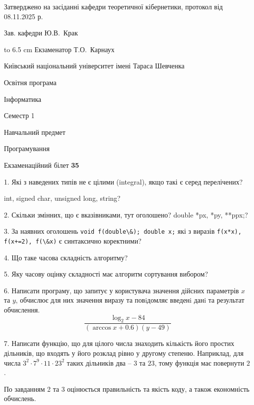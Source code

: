 \documentclass[12pt, ukrainian]{article}
\def\code#1{\Verb!#1!}
\begin{document}
{\smallskip\smallskip \begin {scriptsize} Затверджено на засіданні кафедри теоретичної кібернетики, протокол   від   08.11.2025 р.\par\smallskip\smallskip\smallskip\smallskip
{\parbox {6.5 cm} {Зав. кафедри \dotfill Ю.В.~Крак}}\hspace {0.7cm} {\hbox to 6.5 cm { Екзаменатор \dotfill Т.О.~Карнаух}} \end{scriptsize}}
\newpage
{{\begin {scriptsize}\par
{ \center  Київський національний університет імені Тараса Шевченка \par}
{\parbox {5 cm}{Освітня програма \hfill}{\parbox {7 cm}{Інформатика\hfill}}\parbox {6 cm}{\hfill Семестр 1}}\par
{\parbox {5 cm} {Навчальний предмет \hfill}\parbox {7 cm}{Програмування \hfill}\parbox {6cm}{\hfill}\par}\vspace{-15pt} \end{scriptsize}}{\center Екзаменаційний білет \No \textbf { 35 }\par}}
{%
1. Які з наведених типів не є цілими (integral), якщо такі є серед перелічених?

int, signed char, unsigned long, string?
\par
\vspace{2mm}
2. Скільки змінних, що є вказівниками, тут оголошено?
double *px, *py, **ppx;?
\par
\vspace{2mm}
3. За наявних оголошень \code{void f(double\&); double x;} які з виразів \code{f(x*x), f(x+=2), f(\&x)} є синтаксично коректними?
\par
\vspace{2mm}
4. Що таке часова складність алгоритму?
\par
\vspace{2mm}
5. Яку часову оцінку складності має алгоритм сортування вибором?
\par
\vspace{2mm}
6. Написати програму, що запитує у користувача значення дійсних параметрів $x$ та $y$, обчислює для них значення виразу та повiдомляє введенi данi та результат обчислення.
$$\frac{\log_{2} x - 84}{(\arccos x + 0.6) (y - 49)}$$ 

\par
7. Написати функцію, що для цілого числа знаходить кількість його простих дільників, що входять у його розклад рівно у другому степеню. Наприклад, для числа $3^2{\cdot}7^9{\cdot}11{\cdot}23^{2}$ таких дільників два – $3$ та $23$, тому функція має повернути $2$.

По завданням 2 та 3 оцінюється правильність та якість коду, а також економність обчислень.

}
\end{document}

